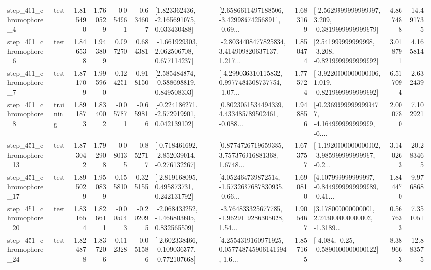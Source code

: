 \begin{tabular}{llrrrrllrlrr}
   step\_401\_chromophore\_4 &      test &      1.815490 &    1.760529 &     -0.054961 & -0.634607 &    [1.823362436, -2.165691075, 0.033430488] &  [2.6586611497188506, -3.429986742568911, -0.69... &       1.683169 &  [-2.5629999999999997, 3.209, -0.3819999999999979] &            4.867488 &         14.491735 \\
   step\_401\_chromophore\_6 &      test &      1.846538 &    1.943809 &      0.097270 &  0.684381 &    [-1.661929303, 2.062506708, 0.677114237] &  [-2.8034408477825834, 3.414909820637137, 1.217... &       1.850474 &   [2.541999999999998, -3.208, -0.8219999999999992] &            3.018791 &          4.165814 \\
   step\_401\_chromophore\_7 &      test &      1.871709 &    1.995960 &      0.124251 &  0.918150 &    [2.585484874, -0.588698819, 0.849508303] &  [-4.299036310115832, 0.9977484308737754, -1.07... &       1.775724 &  [-3.9220000000000006, 1.019, -0.8219999999999992] &            6.517094 &          2.632439 \\
   step\_401\_chromophore\_8 &  training &      1.891873 &    1.834002 &     -0.057871 & -0.659816 &   [-0.224186271, -2.572919901, 0.042139102] &  [0.8023051534494339, 4.433485789502461, -0.088... &       1.948856 &  [-0.23699999999999477, -4.164999999999999, -0.... &            2.000780 &          7.102921 \\
  step\_451\_chromophore\_13 &      test &      1.873042 &    1.792908 &     -0.080135 & -0.852717 &  [-0.718461692, -2.852039014, -0.276132267] &  [0.8774726719659385, 3.757376916881368, 1.6748... &       1.673757 &  [-1.1920000000000002, -3.985999999999997, -0.2... &            3.140263 &         20.283465 \\
  step\_451\_chromophore\_17 &      test &      1.895029 &    1.950839 &      0.055810 &  0.325155 &    [-2.819168095, 0.495873731, 0.242131792] &  [4.052464739872514, -1.5732687687830935, -0.66... &       1.690810 &  [4.107999999999997, -0.8449999999999989, -0.41... &            1.844470 &          9.976868 \\
  step\_451\_chromophore\_20 &      test &      1.831654 &    1.826611 &     -0.005043 & -0.202095 &   [-2.068433252, -1.466803605, 0.832565509] &  [-3.764833325677785, -1.9629119286305028, 1.54... &       1.905467 &  [3.178000000000001, 2.243000000000002, -1.3189... &            0.567633 &          7.351051 \\
  step\_451\_chromophore\_24 &      test &      1.824878 &    1.837206 &      0.012328 & -0.051586 &  [-2.602338466, -0.109036377, -0.772107668] &  [4.2554319160971925, 0.057748745906141694, 1.6... &       1.857165 &               [-4.084, -0.25, -0.5890000000000022] &            8.389663 &         12.883575 \\

\end{tabular}
